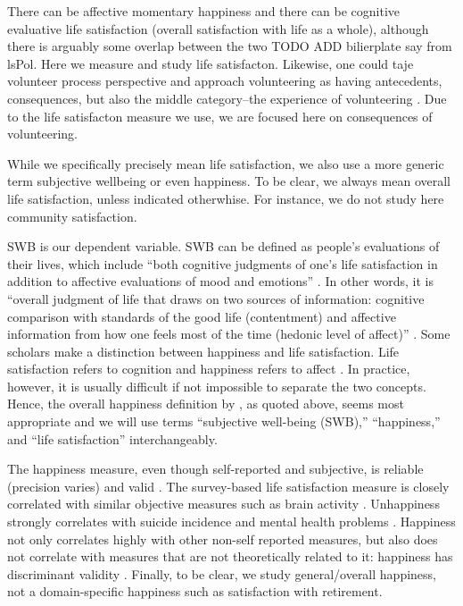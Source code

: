 \documentclass[10pt, letterpaper]{article}
\begin{document}
\begin{spacing}{1.4}
There can be affective momentary happiness and there can be cognitive evaluative
life satisfaction (overall satisfaction with life as a whole), although there is
arguably some overlap between the two TODO ADD bilierplate say from lsPol. Here we measure
and study  life satisfacton.
Likewise, one could taje volunteer process perspective and approach volunteering
as having antecedents, consequences, but also the middle category--the
experience of volunteering \citep{wilson12B}. Due to the life satisfacton
measure we use, we are focused here on consequences of volunteering. 

While we specifically precisely mean life satisfaction, we also use a more
generic term subjective wellbeing or even happiness. To be clear, we always mean
overall life satisfaction, unless indicated otherwhise. For instance, we do not
study here community satisfaction. 


SWB is our dependent variable.
 SWB can be defined as people's evaluations of
their lives, which include ``both cognitive judgments of one's life
satisfaction in addition to affective evaluations of mood and
emotions'' \citep{steel08}. In other words, it is ``overall judgment of life that draws on two sources of information:
  cognitive comparison with standards of the good life (contentment) and
  affective information from how one feels most of the time (hedonic
  level of affect)'' \citep{veenhoven08}.   Some scholars make a
  distinction between happiness and life satisfaction. Life
  satisfaction refers to cognition and happiness refers to affect \citep{dorahy98etal}. In practice, however, it is usually difficult
    if not impossible to separate the two concepts. 
Hence, the overall happiness definition by 
   \citet{veenhoven08}, as quoted above,  seems most appropriate and we will use
   terms ``subjective well-being (SWB),'' ``happiness,'' and ``life
   satisfaction'' interchangeably. 


The happiness measure, even though self-reported and
 subjective, is  reliable (precision varies) %
 and valid \citep{myers00,ditella06m,diener09}. The survey-based life
 satisfaction measure is closely correlated with similar objective
 measures such as brain activity \citep{layard05}.
  Unhappiness strongly
 correlates with suicide incidence and mental health problems
 \citep{bray06g}. Happiness not only correlates highly with other non-self
 reported measures, but also does not correlate with
 measures that are not theoretically related to it: happiness has
 discriminant validity \citep{sandvik93ds}. Finally, to be clear, we  
  study general/overall happiness, not a domain-specific happiness
 such as  satisfaction with retirement. %


\end{spacing}
\end{document}
